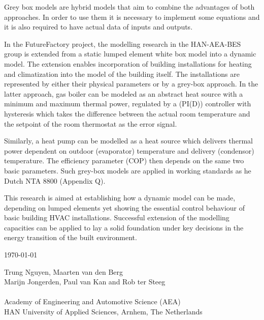 Grey box models are hybrid models that aim to combine the advantages of both approaches. In order to use them it is necessary to implement some equations and it is also required to have actual data of inputs and outputs.

In the FutureFactory project, the modelling research in the HAN-AEA-BES group is extended from a static lumped element white box model into a dynamic model. The extension enables incorporation of building installations for heating and climatization into the model of the building itself. The installations are represented by either their physical parameters or by a grey-box approach. In the latter approach, gas boiler can be modeled as an abstract heat source with a minimum and maximum thermal power, regulated by a (PI(D)) controller with hysteresis which takes the difference between the actual room temperature and the setpoint of the room thermostat as the error signal. 

Similarly, a heat pump can be modelled as a heat source which delivers thermal power dependent on outdoor (evaporator) temperature and delivery (condensor) temperature. The efficiency parameter (COP) then depends on the same two basic parameters. Such grey-box models are applied in working standards as he Dutch NTA 8800 (Appendix Q).

This research is aimed at establishing how a dynamic model can be made, depending on lumped elements yet showing the essential control behaviour of basic building HVAC installations. Successful extension of the modelling capacities can be applied to lay a solid foundation under key decisions in the energy transition of the built environment.

\today

Trung Nguyen, Maarten van den Berg \\
Marijn Jongerden, Paul van Kan and Rob ter Steeg \\ \\
Academy of Engineering and Automotive Science (AEA) \\
HAN University of Applied Sciences, Arnhem, The Netherlands

\newpage
